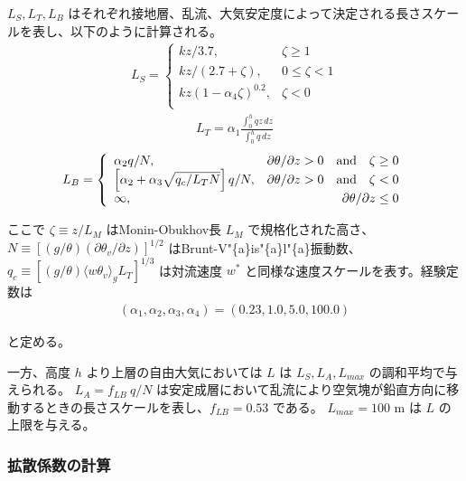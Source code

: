 \(L_S,L_T,L_B\)
はそれぞれ接地層、乱流、大気安定度によって決定される長さスケールを表し、以下のように計算される。
\begin{eqnarray}
L_S=\left\{
    \begin{array}{lr}
      kz/3.7, &\zeta\ge 1\\
      kz/(2.7+\zeta), &0\le\zeta< 1\\
      kz(1-\alpha_4\zeta)^{0.2}, &\zeta< 0\\
    \end{array}
  \right.
\end{eqnarray} \begin{eqnarray}L_T=\alpha_1\frac{\int_0^h{qz}\,dz}{\int_0^h{q}\,dz}\end{eqnarray} \begin{eqnarray}
L_B=\left\{
    \begin{array}{lr}
      \alpha_2 q/N, &\partial\theta/\partial z> 0 \quad\rm{and}\quad\zeta\ge 0\\
      \left[\alpha_2+\alpha_3\sqrt{q_c/L_TN}\right]q/N, &\partial\theta/\partial z> 0 \quad\rm{and}\quad\zeta< 0\\
      \infty, &\partial\theta/\partial z\le 0\\
    \end{array}
  \right.
\end{eqnarray}

ここで \(\zeta\equiv z/L_M\) はMonin-Obukhov長 \(L_M\)
で規格化された高さ、\(N\equiv\left[(g/\theta)(\partial\theta_v/\partial z)\right]^{1/2}\)
はBrunt-V"\{a\}is"\{a\}l"\{a\}振動数、
\(q_c\equiv [(g/\theta)\langle w\theta_v \rangle_gL_T]^{1/3}\)
は対流速度 \(w^*\) と同様な速度スケールを表す。経験定数は
\begin{eqnarray}(\alpha_1,\alpha_2,\alpha_3,\alpha_4)=(0.23,1.0,5.0,100.0)\end{eqnarray}

と定める。

一方、高度 \(h\) より上層の自由大気においては \(L\) は
\(L_S, L_A, L_{max}\) の調和平均で与えられる。 \(L_A=f_{LB}\ q/N\)
は安定成層において乱流により空気塊が鉛直方向に移動するときの長さスケールを表し、\(f_{LB}=0.53\)
である。 \(L_{max}=100\) m は \(L\) の上限を与える。

\hypertarget{ux62e1ux6563ux4fc2ux6570ux306eux8a08ux7b97}{%
\subsubsection{拡散係数の計算}\label{ux62e1ux6563ux4fc2ux6570ux306eux8a08ux7b97}}

